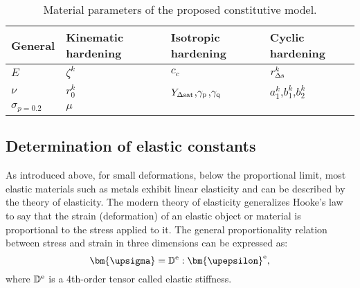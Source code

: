 \begin{table}[htbp]
  \centering
  \caption{Material parameters of the proposed constitutive model.}
    \begin{tabular}{llll}
    \toprule
    General & Kinematic hardening & Isotropic hardening & Cyclic hardening \\
    \midrule
    $E$   & $\zeta^k$ & $c_c$ & $r_{\Delta \rm{s}}^k$ \\
    $\nu$ & $r_0^k$ & $Y_{\Delta \rm{sat}}$,$\gamma_{\rm{p}}$,$\gamma_{\rm{q}}$ & $a_1^k$,$b_1^k$,$b_2^k$ \\
    $\sigma_{p=0.2}$ & $\mu$ &  & \\
    \bottomrule
    \end{tabular}%
  \label{tab:ParametersCollection}%
\end{table}%


\subsection{Determination of elastic constants}
\noindent
As introduced above, for small deformations, below the proportional limit, most elastic materials such as metals exhibit linear elasticity and can be described by the theory of elasticity.
The modern theory of elasticity generalizes Hooke's law to say that the strain (deformation) of an elastic object or material is proportional to the stress applied to it.
The general proportionality relation between stress and strain in three dimensions can be expressed as:
\begin{equation}
{\bm{\upsigma }} = {\mathbb{D}^{\rm{e}}}:{{\bm{\upepsilon }}^{\rm{e}}},
\label{Equ:HookesLaw}
\end{equation}
where ${\mathbb{D}^{\rm{e}}}$ is a 4th-order tensor called elastic stiffness.

